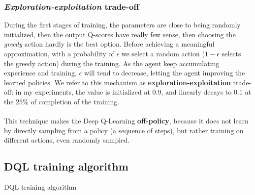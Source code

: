 \documentclass{beamer}
\begin{document}
\begin{frame}
\frametitle{\textit{Exploration-exploitation} trade-off}
 During the first stages of training, the parameters are close to being randomly initialized, then the output Q-scores have really few sense, then choosing the \textit{greedy} action hardly is the best option. Before achieving a meaningful approximation, with a probability of $\epsilon$ we select a random action ($1 - \epsilon$ selects the greedy action) during the training. As the agent keep accumulating experience and training, $\epsilon$ will tend to decrease, letting the agent improving the learned policies. We refer to this mechanism as \textbf{exploration-exploitation} trade-off: in my\label{our} experiments, the value is initialized at $0.9$, and linearly decays to $0.1$ at the $25\%$ of completion of the training.\\~\\
 This technique makes the Deep Q-Learning \textbf{off-policy}, because it does not learn by directly sampling from a policy (a sequence of steps), but rather training on different actions, even randomly sampled.
\end{frame}

\subsection{DQL training algorithm}
\begin{frame}{DQL training algorithm}
	\begin{center}
	\end{center}
\end{frame}
\end{document}
